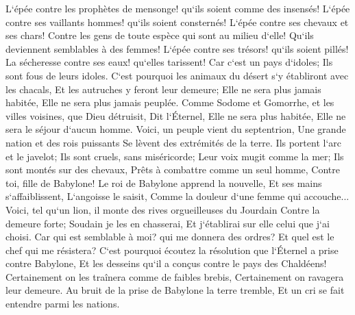 \verse L`épée contre les prophètes de mensonge! qu`ils soient comme des insensés! L`épée contre ses vaillants hommes! qu`ils soient consternés! 
\verse L`épée contre ses chevaux et ses chars! Contre les gens de toute espèce qui sont au milieu d`elle! Qu`ils deviennent semblables à des femmes! L`épée contre ses trésors! qu`ils soient pillés! 
\verse La sécheresse contre ses eaux! qu`elles tarissent! Car c`est un pays d`idoles; Ils sont fous de leurs idoles. 
\verse C`est pourquoi les animaux du désert s`y établiront avec les chacals, Et les autruches y feront leur demeure; Elle ne sera plus jamais habitée, Elle ne sera plus jamais peuplée. 
\verse Comme Sodome et Gomorrhe, et les villes voisines, que Dieu détruisit, Dit l`Éternel, Elle ne sera plus habitée, Elle ne sera le séjour d`aucun homme. 
\verse Voici, un peuple vient du septentrion, Une grande nation et des rois puissants Se lèvent des extrémités de la terre. 
\verse Ils portent l`arc et le javelot; Ils sont cruels, sans miséricorde; Leur voix mugit comme la mer; Ils sont montés sur des chevaux, Prêts à combattre comme un seul homme, Contre toi, fille de Babylone! 
\verse Le roi de Babylone apprend la nouvelle, Et ses mains s`affaiblissent, L`angoisse le saisit, Comme la douleur d`une femme qui accouche... 
\verse Voici, tel qu`un lion, il monte des rives orgueilleuses du Jourdain Contre la demeure forte; Soudain je les en chasserai, Et j`établirai sur elle celui que j`ai choisi. Car qui est semblable à moi? qui me donnera des ordres? Et quel est le chef qui me résistera? 
\verse C`est pourquoi écoutez la résolution que l`Éternel a prise contre Babylone, Et les desseins qu`il a conçus contre le pays des Chaldéens! Certainement on les traînera comme de faibles brebis, Certainement on ravagera leur demeure. 
\verse Au bruit de la prise de Babylone la terre tremble, Et un cri se fait entendre parmi les nations. 

